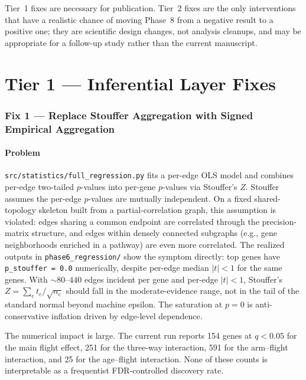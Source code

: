 \documentclass[11pt]{article}
\newcommand{\code}[1]{\texttt{#1}}
\begin{document}
\noindent Tier~1 fixes are necessary for publication. Tier~2 fixes are the only interventions that have a realistic chance of moving Phase~8 from a negative result to a positive one; they are scientific design changes, not analysis cleanups, and may be appropriate for a follow-up study rather than the current manuscript.

\clearpage

\part*{Tier 1 — Inferential Layer Fixes}

\section{Fix 1 --- Replace Stouffer Aggregation with Signed Empirical Aggregation}

\subsection{Problem}

\code{src/statistics/full\_regression.py} fits a per-edge OLS model and combines per-edge two-tailed $p$-values into per-gene $p$-values via Stouffer's $Z$. Stouffer assumes the per-edge $p$-values are mutually independent. On a fixed shared-topology skeleton built from a partial-correlation graph, this assumption is violated: edges sharing a common endpoint are correlated through the precision-matrix structure, and edges within densely connected subgraphs (e.g., gene neighborhoods enriched in a pathway) are even more correlated. The realized outputs in \code{phase6\_regression/} show the symptom directly: top genes have \code{p\_stouffer = 0.0} numerically, despite per-edge median $|t|<1$ for the same genes. With $\sim 80$--$440$ edges incident per gene and per-edge $|t|<1$, Stouffer's $Z = \sum_e t_e / \sqrt{n_e}$ should fall in the moderate-evidence range, not in the tail of the standard normal beyond machine epsilon. The saturation at $p=0$ is anti-conservative inflation driven by edge-level dependence.

The numerical impact is large. The current run reports 154 genes at $q<0.05$ for the main flight effect, 251 for the three-way interaction, 591 for the arm--flight interaction, and 25 for the age--flight interaction. None of these counts is interpretable as a frequentist FDR-controlled discovery rate.
\end{document}
